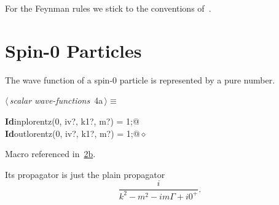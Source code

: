 \documentclass[a4paper,12pt]{amsart}
\renewcommand{\NWtarget}[2]{\hypertarget{#1}{#2}}
\renewcommand{\NWlink}[2]{\hyperlink{#1}{#2}}
\renewcommand{\NWtxtMacroRefIn}{Macro referenced in}
\renewcommand{\NWsep}{${\diamond}$}
\begin{document}
\begin{flushleft}
\begin{list}{}{\setlength{\itemsep}{-\parsep}\setlength{\itemindent}{-\leftmargin}}
\item{}
\end{list}
\vspace{4ex}
\end{flushleft}
For the Feynman rules we stick to the conventions of~\cite{1}.
\section{Spin-0 Particles}
The wave function of a spin-0 particle is represented by a pure number.
\begin{flushleft} \small
\begin{minipage}{\linewidth}\label{scrap4}\raggedright\small
\NWtarget{nuweb4a}{} $\langle\,${\itshape scalar wave-functions}\nobreak\ {\footnotesize {4a}}$\,\rangle\equiv$
\vspace{-1ex}
\begin{list}{}{} \item
\mbox{}\verb@@\hbox{\sffamily\bfseries Id}\verb@ inplorentz(0, iv?, k1?, m?) = 1;@\\
\mbox{}\verb@@\hbox{\sffamily\bfseries Id}\verb@ outlorentz(0, iv?, k1?, m?) = 1;@{\NWsep}
\end{list}
\vspace{-1.5ex}
\footnotesize
\begin{list}{}{\setlength{\itemsep}{-\parsep}\setlength{\itemindent}{-\leftmargin}}
\item \NWtxtMacroRefIn\ \NWlink{nuweb2b}{2b}.

\item{}
\end{list}
\end{minipage}\vspace{4ex}
\end{flushleft}
Its propagator is just the plain propagator
\begin{equation}
\frac{i}{k^2-m^2-im\Gamma+i0^+}\text{.}
\end{equation}
\end{document}
